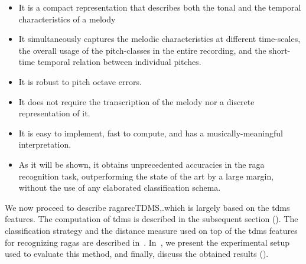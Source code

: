 \begin{itemize}
	\item It is a compact representation that describes both the tonal and the temporal characteristics of a melody
	\item It simultaneously captures the melodic characteristics at different time-scales, the overall usage of the pitch-classes in the entire recording, and the short-time temporal relation between individual pitches.
	\item It is robust to pitch octave errors.
	\item It does not require the transcription of the melody nor a discrete representation of it.
	\item It is easy to implement, fast to compute, and has a musically-meaningful interpretation.
	\item As it will be shown, it obtains unprecedented accuracies in the raga recognition task, outperforming the state of the art by a large margin, without the use of any elaborated classification schema.
\end{itemize}

We now proceed to describe \acrshort{ragarecTDMS},.which is largely based on the \gls{tdms} features. The computation of \gls{tdms} is described in the subsequent section (). The classification strategy and the distance measure used on top of the \gls{tdms} features for recognizing \glspl{raga} are described in~. In~, we present the experimental setup used to evaluate this method, and finally, discuss the obtained results (). 

\subsection{}
\label{sec:tdms_feature_extraction}

